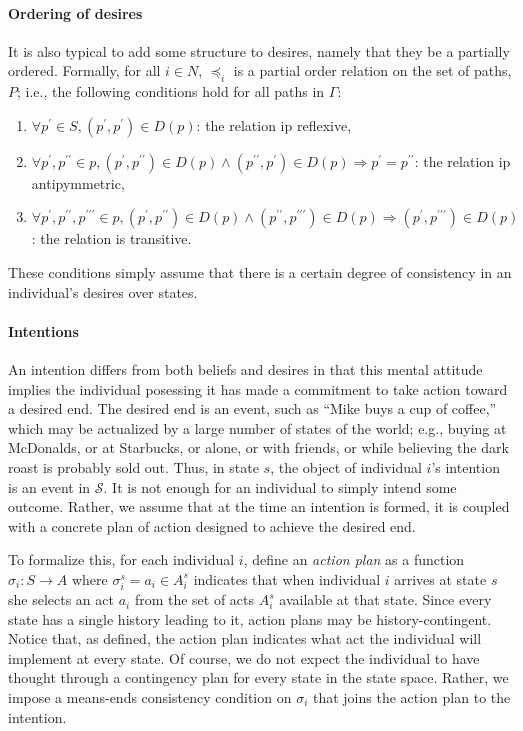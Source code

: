 \documentclass[
11pt,
titlepage,
reqno,
]{article}%
\theoremstyle{definition}
\begin{document}
	\paragraph{Ordering of desires \label{para: desire ordering}} 
	It is also typical to add some structure to desires, namely that they be a partially ordered. 
	Formally, for all $i\in N$, $\preceq_i$ is a partial order relation on the set of paths, $P$; i.e., the following conditions hold for all paths in $\Gamma$:
	\begin{enumerate}
		\item $\forall  p^\prime\in S, (p^\prime,p^\prime)\in D(p)$: the relation ip reflexive,
		\item $\forall  p^\prime,p^{\prime\prime}\in p,(p^\prime,p^{\prime\prime})\in D(p)\wedge (p^{\prime\prime},p^\prime)\in D(p)\Rightarrow p^\prime=p^{\prime\prime}$: the relation ip antipymmetric,
		\item $\forall  p^\prime, p^{\prime\prime}, p^{\prime\prime\prime}\in p, (p^\prime,p^{\prime\prime})\in D(p)\wedge (p^{\prime\prime},p^{\prime\prime\prime})\in D(p)\Rightarrow  (p^{\prime},p^{\prime\prime\prime})\in D(p)$: the relation is transitive.
	\end{enumerate} 
	These conditions simply assume that there is a certain degree of consistency in an individual's desires over states. 
	
	\paragraph{Intentions\label{para: intentons}} 
	An intention differs from both beliefs and desires in that this mental attitude implies the individual posessing it has made a commitment to take action toward a desired end. 
	The desired end is an event, such as ``Mike buys a cup of coffee,'' which may be actualized by a large number of states of the world; e.g., buying at McDonalds, or at Starbucks, or alone, or with friends, or while believing the dark roast is probably sold out. Thus, in state $s$, the object of individual $i$'s intention is an event in $\mathcal{S}$. 
	It is not enough for an individual to simply intend some outcome. 
	Rather, we assume that at the time an intention is formed, it is coupled with a concrete plan of action designed to achieve the desired end. 
	
	To formalize this, for each individual $i$, define an \textit{action plan} as a function $\sigma_i:S\rightarrow A$ where $\sigma_i^s=a_i\in A_i^s$ indicates that when individual $i$ arrives at state $s$ she selects an act $a_i$ from the set of acts $A_i^s$ available at that state. 
	Since every state has a single history leading to it, action plans may be history-contingent.
	Notice that, as defined, the action plan indicates what act the individual will implement at every state. 
	Of course, we do not expect the individual to have thought through a contingency plan for every state in the state space. 
	Rather, we impose a means-ends consistency condition on $\sigma_i$ that joins the action plan to the intention.
	
\end{document}
